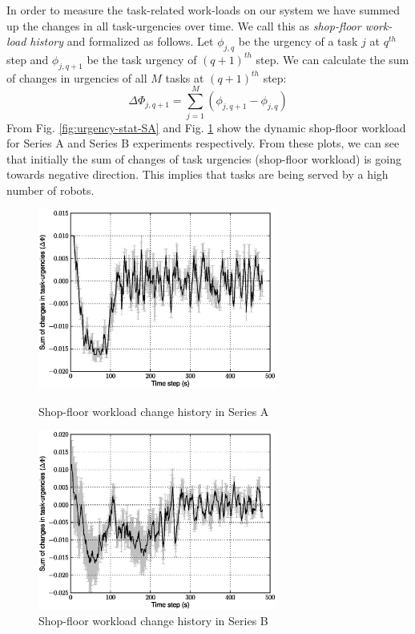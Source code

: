 \documentclass[smallcondensed]{svjour3}
\begin{document}
In order to measure the task-related work-loads on our system we have summed up the changes in all task-urgencies over time. We call this as {\em shop-floor work-load history} and formalized as follows. Let $ \phi_{j, q}$ be the urgency of a task $j$ at $q^{th}$ step and $\phi_{j, q+1}$ be the task urgency of $(q+1)^{th}$ step. We can calculate the sum of changes in urgencies of all $M$ tasks at $(q+1)^{th}$ step:
\begin{equation} 
\Delta \Phi_{j, q+1} = \sum_{j=1}^{M} (\phi_{j, q+1} - \phi_{j, q})
\label{eqn:Delta-Phi}
\end{equation}
From Fig. \ref{fig:urgency-stat-SA} and Fig. \ref{fig:urgency-stat-SB} show the dynamic shop-floor workload for Series A and Series B experiments respectively. From these plots, we can see that initially the sum of changes of task urgencies (shop-floor workload) is going towards negative direction. This implies that tasks are being served by a high number of robots. 
\begin{figure}
\centering
\includegraphics[width=0.7\textwidth, angle=0]
{./8robots2tasks-TaskUrgencyStat.eps}
\caption{\small Shop-floor workload change history in Series A} 
\label{fig:urgency-stat-SA} %
\centering
\includegraphics[width=0.7\textwidth, angle=0]{./TaskUrgencyStat.eps}
\caption{\small Shop-floor workload change history in Series B} %
\label{fig:urgency-stat-SB} %
\end{figure}
\end{document}
